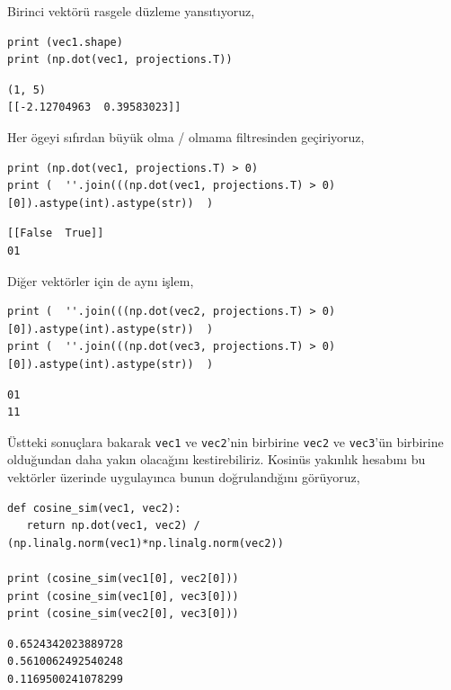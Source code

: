 \documentclass[12pt,fleqn]{article}\usepackage{../../common}
\begin{document}
Birinci vektörü rasgele düzleme yansıtıyoruz,

\begin{verbatim}
print (vec1.shape)
print (np.dot(vec1, projections.T))
\end{verbatim}

\begin{verbatim}
(1, 5)
[[-2.12704963  0.39583023]]
\end{verbatim}

Her ögeyi sıfırdan büyük olma / olmama filtresinden geçiriyoruz,

\begin{verbatim}
print (np.dot(vec1, projections.T) > 0)
print (  ''.join(((np.dot(vec1, projections.T) > 0)[0]).astype(int).astype(str))  )
\end{verbatim}

\begin{verbatim}
[[False  True]]
01
\end{verbatim}

Diğer vektörler için de aynı işlem,

\begin{verbatim}
print (  ''.join(((np.dot(vec2, projections.T) > 0)[0]).astype(int).astype(str))  )
print (  ''.join(((np.dot(vec3, projections.T) > 0)[0]).astype(int).astype(str))  )
\end{verbatim}

\begin{verbatim}
01
11
\end{verbatim}

Üstteki sonuçlara bakarak \verb!vec1! ve \verb!vec2!'nin birbirine \verb!vec2! ve
\verb!vec3!'ün birbirine olduğundan daha yakın olacağını kestirebiliriz. Kosinüs
yakınlık hesabını bu vektörler üzerinde uygulayınca bunun doğrulandığını görüyoruz,

\begin{verbatim}
def cosine_sim(vec1, vec2):
   return np.dot(vec1, vec2) / (np.linalg.norm(vec1)*np.linalg.norm(vec2))

print (cosine_sim(vec1[0], vec2[0]))   
print (cosine_sim(vec1[0], vec3[0]))   
print (cosine_sim(vec2[0], vec3[0]))   
\end{verbatim}

\begin{verbatim}
0.6524342023889728
0.5610062492540248
0.1169500241078299
\end{verbatim}
\end{document}
